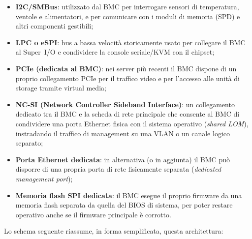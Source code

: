 \documentclass[11pt,a4paper]{article}
\begin{document}
\begin{itemize}[nosep]
    \item \textbf{I2C/SMBus}: utilizzato dal BMC per interrogare sensori di temperatura, ventole e alimentatori, e per comunicare con i moduli di memoria (SPD) e altri componenti gestibili;
    \item \textbf{LPC o eSPI}: bus a bassa velocità storicamente usato per collegare il BMC al Super~I/O e condividere la console seriale/KVM con il chipset;
    \item \textbf{PCIe (dedicata al BMC)}: nei server più recenti il BMC dispone di un proprio collegamento PCIe per il traffico video e per l'accesso alle unità di storage tramite virtual media;
    \item \textbf{NC-SI (Network Controller Sideband Interface)}: un collegamento dedicato tra il BMC e la scheda di rete principale che consente al BMC di condividere una porta Ethernet fisica con il sistema operativo (\emph{shared LOM}), instradando il traffico di management su una VLAN o un canale logico separato;
    \item \textbf{Porta Ethernet dedicata}: in alternativa (o in aggiunta) il BMC può disporre di una propria porta di rete fisicamente separata (\emph{dedicated management port});
    \item \textbf{Memoria flash SPI dedicata}: il BMC esegue il proprio firmware da una memoria flash separata da quella del BIOS di sistema, per poter restare operativo anche se il firmware principale è corrotto.
\end{itemize}

Lo schema seguente riassume, in forma semplificata, questa architettura:
\end{document}
